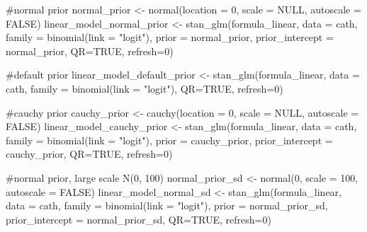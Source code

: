 \documentclass[
  letterpaper,
  DIV=11,
  numbers=noendperiod]{scrartcl}
\newenvironment{Shaded}{\begin{snugshade}}{\end{snugshade}}
\newcommand{\AttributeTok}[1]{\textcolor[rgb]{0.40,0.45,0.13}{#1}}
\newcommand{\CommentTok}[1]{\textcolor[rgb]{0.37,0.37,0.37}{#1}}
\newcommand{\ConstantTok}[1]{\textcolor[rgb]{0.56,0.35,0.01}{#1}}
\newcommand{\DecValTok}[1]{\textcolor[rgb]{0.68,0.00,0.00}{#1}}
\newcommand{\FunctionTok}[1]{\textcolor[rgb]{0.28,0.35,0.67}{#1}}
\newcommand{\NormalTok}[1]{\textcolor[rgb]{0.00,0.23,0.31}{#1}}
\newcommand{\OtherTok}[1]{\textcolor[rgb]{0.00,0.23,0.31}{#1}}
\newcommand{\StringTok}[1]{\textcolor[rgb]{0.13,0.47,0.30}{#1}}
\begin{document}
\begin{Shaded}
\begin{Highlighting}[]
\CommentTok{\#normal prior}
\NormalTok{normal\_prior }\OtherTok{\textless{}{-}} \FunctionTok{normal}\NormalTok{(}\AttributeTok{location =} \DecValTok{0}\NormalTok{, }\AttributeTok{scale =} \ConstantTok{NULL}\NormalTok{, }\AttributeTok{autoscale =} \ConstantTok{FALSE}\NormalTok{)}
\NormalTok{linear\_model\_normal\_prior }\OtherTok{\textless{}{-}} \FunctionTok{stan\_glm}\NormalTok{(formula\_linear, }\AttributeTok{data =}\NormalTok{ cath,}
                \AttributeTok{family =} \FunctionTok{binomial}\NormalTok{(}\AttributeTok{link =} \StringTok{"logit"}\NormalTok{),}
                \AttributeTok{prior =}\NormalTok{ normal\_prior, }\AttributeTok{prior\_intercept =}\NormalTok{ normal\_prior,}
                \AttributeTok{QR=}\ConstantTok{TRUE}\NormalTok{, }\AttributeTok{refresh=}\DecValTok{0}\NormalTok{)}

\CommentTok{\#default prior}
\NormalTok{linear\_model\_default\_prior }\OtherTok{\textless{}{-}} \FunctionTok{stan\_glm}\NormalTok{(formula\_linear, }\AttributeTok{data =}\NormalTok{ cath,}
                \AttributeTok{family =} \FunctionTok{binomial}\NormalTok{(}\AttributeTok{link =} \StringTok{"logit"}\NormalTok{),}
                \AttributeTok{QR=}\ConstantTok{TRUE}\NormalTok{, }\AttributeTok{refresh=}\DecValTok{0}\NormalTok{)}

\CommentTok{\#cauchy prior}
\NormalTok{cauchy\_prior }\OtherTok{\textless{}{-}} \FunctionTok{cauchy}\NormalTok{(}\AttributeTok{location =} \DecValTok{0}\NormalTok{, }\AttributeTok{scale =} \ConstantTok{NULL}\NormalTok{, }\AttributeTok{autoscale =} \ConstantTok{FALSE}\NormalTok{)}
\NormalTok{linear\_model\_cauchy\_prior }\OtherTok{\textless{}{-}} \FunctionTok{stan\_glm}\NormalTok{(formula\_linear, }\AttributeTok{data =}\NormalTok{ cath,}
                \AttributeTok{family =} \FunctionTok{binomial}\NormalTok{(}\AttributeTok{link =} \StringTok{"logit"}\NormalTok{),}
                \AttributeTok{prior =}\NormalTok{ cauchy\_prior, }\AttributeTok{prior\_intercept =}\NormalTok{ cauchy\_prior,}
                \AttributeTok{QR=}\ConstantTok{TRUE}\NormalTok{, }\AttributeTok{refresh=}\DecValTok{0}\NormalTok{)}

\CommentTok{\#normal prior, large scale N(0, 100)}
\NormalTok{normal\_prior\_sd }\OtherTok{\textless{}{-}} \FunctionTok{normal}\NormalTok{(}\DecValTok{0}\NormalTok{, }\AttributeTok{scale =} \DecValTok{100}\NormalTok{, }\AttributeTok{autoscale =} \ConstantTok{FALSE}\NormalTok{)}
\NormalTok{linear\_model\_normal\_sd }\OtherTok{\textless{}{-}} \FunctionTok{stan\_glm}\NormalTok{(formula\_linear, }\AttributeTok{data =}\NormalTok{ cath,}
                \AttributeTok{family =} \FunctionTok{binomial}\NormalTok{(}\AttributeTok{link =} \StringTok{"logit"}\NormalTok{),}
                \AttributeTok{prior =}\NormalTok{ normal\_prior\_sd, }\AttributeTok{prior\_intercept =}\NormalTok{ normal\_prior\_sd,}
                \AttributeTok{QR=}\ConstantTok{TRUE}\NormalTok{, }\AttributeTok{refresh=}\DecValTok{0}\NormalTok{)}


\end{Highlighting}
\end{Shaded}
\end{document}
